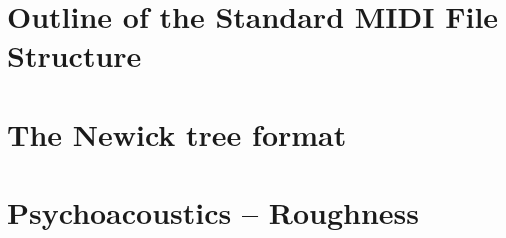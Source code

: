 \documentclass{book}
\begin{document}


\newpage
\section{Outline of the Standard MIDI File Structure}
\label{infomidi}


\newpage
\section{The Newick tree format}
\label{nwdoc}


\newpage
\section{Psychoacoustics -- Roughness}
\label{rugdoc}















\end{document}
